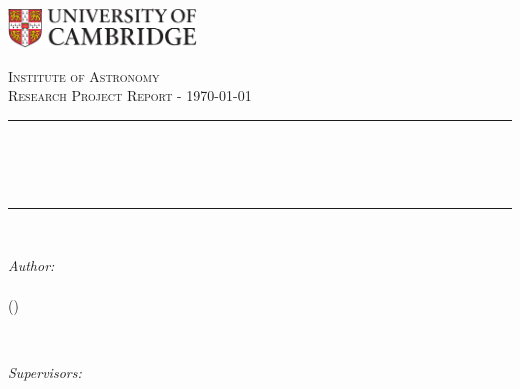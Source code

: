 \begin{titlepage}

\newcommand{\HRule}{\rule{\linewidth}{0.5mm}} %


\includegraphics[width = 5cm]{images/cam.pdf}\\[0.5cm] 

\center %


\textsc{\Large Institute of Astronomy}\\[0.5cm] 
\textsc{\large Research  Project Report - \today}\\[0.5cm]


\HRule \\[0.4cm]
{ \Huge \bfseries \reporttitle}\\
{ \Large \bfseries \reportsubtitle}\\ %
\HRule \\[1.5cm]
\linespread{1.2}

\begin{minipage}[t]{0.4\textwidth}
\begin{flushleft} \large
\emph{Author:}\\
\reportauthor\\
(\cid)

\end{flushleft}
\end{minipage}
~
\begin{minipage}[t]{0.4\textwidth}
\begin{flushright} \large
\emph{Supervisors:} \\
\supervisorone \\
\supervisortwo \\
\end{flushright}
\end{minipage}\\[2cm]


\end{titlepage}
